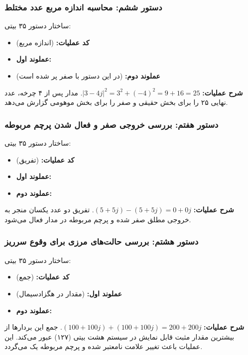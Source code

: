 \documentclass[11pt,a4paper]{article}
\begin{document}
\subsubsection{دستور ششم: محاسبه اندازه مربع عدد مختلط}
ساختار دستور ۳۵ بیتی: 
\begin{itemize}
    \item \textbf{کد عملیات:}  (اندازه مربع)
    \item \textbf{عملوند اول:} 
    \item \textbf{عملوند دوم:} (در این دستور با صفر پر شده است)
\end{itemize}
\textbf{شرح عملیات:} $|3-4j|^2 = 3^2 + (-4)^2 = 9 + 16 = 25$. مدار پس از ۴ چرخه، عدد نهایی ۲۵ را برای بخش حقیقی و صفر را برای بخش موهومی گزارش می‌دهد.

\subsubsection{دستور هفتم: بررسی خروجی صفر و فعال شدن پرچم مربوطه}
ساختار دستور ۳۵ بیتی: 
\begin{itemize}
    \item \textbf{کد عملیات:}  (تفریق)
    \item \textbf{عملوند اول:} 
    \item \textbf{عملوند دوم:} 
\end{itemize}
\textbf{شرح عملیات:} $(5+5j) - (5+5j) = 0+0j$. تفریق دو عدد یکسان منجر به خروجی مطلق صفر شده و پرچم مربوطه در مدار فعال می‌شود.

\subsubsection{دستور هشتم: بررسی حالت‌های مرزی برای وقوع سرریز}
ساختار دستور ۳۵ بیتی: 
\begin{itemize}
    \item \textbf{کد عملیات:}  (جمع)
    \item \textbf{عملوند اول:}  (مقدار  در هگزادسیمال)
    \item \textbf{عملوند دوم:} 
\end{itemize}
\textbf{شرح عملیات:} $(100+100j) + (100+100j) = 200+200j$. جمع این بردارها از بیشترین مقدار مثبت قابل نمایش در سیستم هشت بیتی (۱۲۷) عبور می‌کند. این عملیات باعث تغییر علامت نامعتبر شده و پرچم مربوطه یک می‌گردد.
\end{document}

